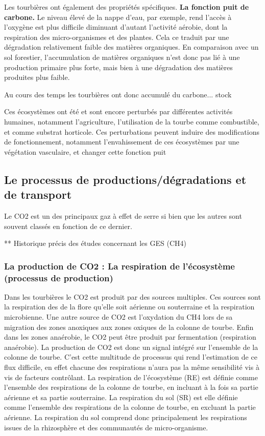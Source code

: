 Les tourbières ont également des propriétés spécifiques.
\textbf{La fonction puit de carbone.}
Le niveau élevé de la nappe d'eau, par exemple, rend l'accès à l'oxygène est plus difficile diminuant d'autant l'activité aérobie, dont la respiration des micro-organismes et des plantes.
Cela ce traduit par une dégradation relativement faible des matières organiques.
En comparaison avec un sol forestier, l'accumulation de matières organiques n'est donc pas lié à une production primaire plus forte, mais bien à une dégradation des matières produites plus faible.

Au cours des temps les tourbières ont donc accumulé du carbone... stock

Ces écosystèmes ont été et sont encore perturbés par différentes activités humaines, notamment l'agriculture, l'utilisation de la tourbe comme combustible, et comme substrat horticole.
Ces perturbations peuvent induire des modifications de fonctionnement, notamment l'envahissement de ces écosystèmes par une végétation vasculaire, et changer cette fonction puit



\subsection{Le \COO processus de productions/dégradations et de transport}

Le CO2 est un des principaux gaz à effet de serre si bien que les autres sont souvent classés en fonction de ce dernier.

** Historique précis des études concernant les GES (CH4)

\subsubsection{La production de CO2 : La respiration de l'écosystème (processus de production)}
Dans les tourbières le CO2 est produit par des sources multiples.
Ces sources sont la respiration des de la flore qu'elle soit aérienne ou souterraine et la respiration microbienne.
Une autre source de CO2 est l'oxydation du CH4 lors de sa migration des zones anoxiques aux zones oxiques de la colonne de tourbe.
Enfin dans les zones anaérobie, le CO2 peut être produit par fermentation (respiration anaérobie).
La production de CO2 est donc un signal intégré sur l'ensemble de la colonne de tourbe. 
C'est cette multitude de processus qui rend l'estimation de ce flux difficile, en effet chacune des respirations n'aura pas la même sensibilité vis à vis de facteurs contrôlant.
La respiration de l'écosystème (RE) est définie comme l'ensemble des respirations de la colonne de tourbe, en incluant à la fois sa partie aérienne et sa partie souterraine.
La respiration du sol (SR) est elle définie comme l'ensemble des respirations de la colonne de tourbe, en excluant la partie aérienne.
La respiration du sol comprend donc principalement les respirations issues de la rhizosphère et des communautés de micro-organisme.

